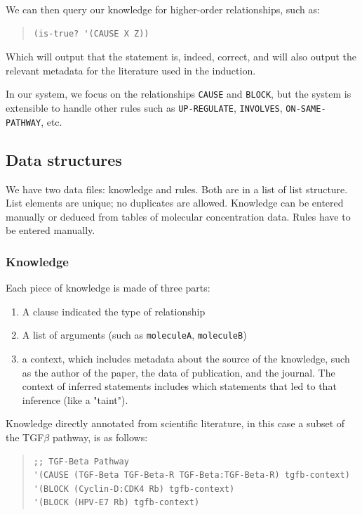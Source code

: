 \documentclass[11pt]{article}
\begin{document}
We can then query our knowledge for higher-order relationships, such as:

\begin{quote}
\begin{verbatim}
(is-true? '(CAUSE X Z))
\end{verbatim}
\end{quote}


Which will output that the statement is, indeed, correct, and will also output the relevant metadata for the literature used in the induction.

In our system, we focus on the relationships \texttt{CAUSE} and \texttt{BLOCK}, but the system is extensible to handle other rules such as \texttt{UP-REGULATE}, \texttt{INVOLVES}, \texttt{ON-SAME-PATHWAY}, etc.

\subsection{Data structures}
\label{sec-2-1}
We have two data files: knowledge and rules. Both are in a list of list structure. List elements are unique; no duplicates are allowed. Knowledge can be entered manually or deduced from tables of molecular concentration data. Rules have to be entered manually.

\subsubsection{Knowledge}
\label{sec-2-1-1}
Each piece of knowledge is made of three parts:

\begin{enumerate}
\item A clause indicated the type of relationship
\item A list of arguments (such as \texttt{moleculeA}, \texttt{moleculeB})
\item a context, which includes metadata about the source of the knowledge, such as the author of the paper, the data of publication, and the journal.  The context of inferred statements includes which statements that led to that inference (like a "taint").
\end{enumerate}

Knowledge directly annotated from scientific literature, in this case a subset of the TGF$\beta$ pathway, is as follows:

\begin{quote}
\begin{verbatim}
;; TGF-Beta Pathway
'(CAUSE (TGF-Beta TGF-Beta-R TGF-Beta:TGF-Beta-R) tgfb-context)
'(BLOCK (Cyclin-D:CDK4 Rb) tgfb-context)
'(BLOCK (HPV-E7 Rb) tgfb-context)
\end{verbatim}
\end{quote}
\end{document}
